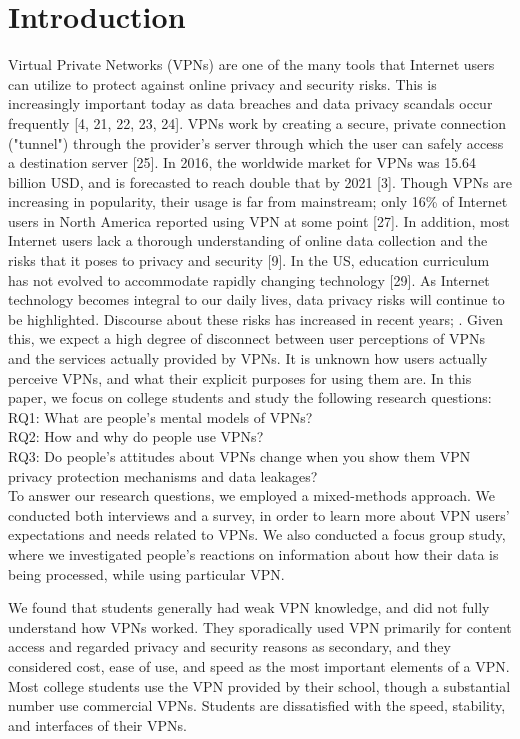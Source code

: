 \section{Introduction}

Virtual Private Networks (VPNs) are one of the many tools that Internet users can utilize to
protect against online privacy and security risks. This is increasingly important today as data breaches and data privacy scandals occur frequently [4, 21, 22, 23, 24]. VPNs work by creating a
secure, private connection ("tunnel") through the provider's server through
which the user can safely access a destination server [25].   In 2016, the
worldwide market for VPNs was 15.64 billion USD, and is forecasted to reach
double that by 2021 [3]. Though VPNs are
increasing in popularity, their usage is far from mainstream; only 16\% of
Internet users in North America reported using VPN at some point [27]. In
addition, most Internet users lack a thorough understanding of online data
collection and the risks that it poses to privacy and security [9]. In the US,
education curriculum has not evolved to accommodate rapidly changing
technology [29]. As Internet technology becomes integral to our daily lives, data privacy risks
will continue to be highlighted. Discourse about these risks has increased in
recent years; . Given this, we expect a high degree of disconnect between
user perceptions of VPNs and the services actually provided by VPNs. It is
unknown how users actually perceive VPNs, and what their explicit purposes for
using them are. In this paper, we focus on college students and study the
following research questions:\\
RQ1: What are people’s mental models of VPNs?\\
RQ2: How and why do people use VPNs?\\
RQ3: Do people’s attitudes about VPNs change when you show them VPN privacy protection mechanisms and data leakages?\\

To answer our research questions, we employed a mixed-methods approach. We conducted both interviews and a survey, in order to learn more about VPN users' expectations and needs related to VPNs. We also conducted a focus group study, where we investigated people's reactions on information about how their data is being processed, while using particular VPN.

We found that students generally had weak VPN knowledge, and did not fully
understand how VPNs worked. They sporadically used VPN primarily for content
access and regarded privacy and security reasons as secondary, and they
considered cost, ease of use, and speed as the most important elements of a
VPN. Most college students use the VPN provided by their school, though a
substantial number use commercial VPNs. Students are dissatisfied with the
speed, stability, and interfaces of their VPNs.

